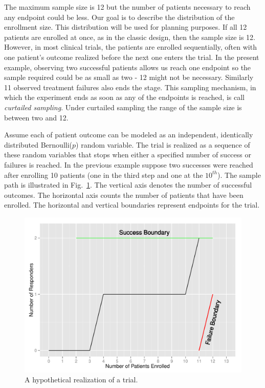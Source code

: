 \documentclass[review]{elsarticle}
\begin{document}
The maximum sample size is 12 but the number of patients necessary to
reach any endpoint could be less. Our goal is to describe the distribution of
the enrollment size. This distribution will be used for planning purposes. 
If all 12 patients are enrolled at once, as in the classic
design, then the sample size is 12. However, in most clinical trials, the
patients are enrolled sequentially, often with one patient's outcome realized
before the next one enters the trial. In the present example, observing two
successful patients allows us reach one endpoint so the sample required
could be as small as two - 12 might not be necessary. Similarly 11
observed treatment failures also ends the stage. This sampling mechanism, in
which the experiment ends as soon as any of the endpoints is reached, is
call {\em curtailed sampling}. Under curtailed sampling the range of the
sample size is between two and 12.

Assume each of patient outcome can be modeled as an independent,
identically distributed Bernoulli($p$) random variable. The trial is realized
as a sequence of these random variables that stops when either a
specified number of success or failures is reached. In the
previous example suppose two successes were reached after enrolling 10
patients (one in the third step and one at the $10^{th}$). The sample
path is illustrated
in Fig.~\ref{fig:kane_viz}. The vertical axis denotes the number of
successful outcomes. The horizontal axis counts the number of patients that
have been enrolled. The horizontal and vertical boundaries represent
endpoints for the trial.

\begin{figure}[t!]
\includegraphics[width=\textwidth]{KanePlot.pdf}
\caption{
A hypothetical realization of a trial.
}
\label{fig:kane_viz}
\end{figure}
\end{document}
